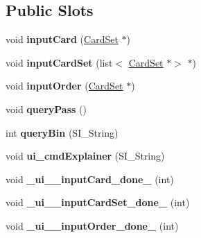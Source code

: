 \subsection*{Public Slots}
\begin{DoxyCompactItemize}
\item 
\mbox{\label{class_user_interaction_a19c4330dde326f5593946abf8f7cd213}} 
void {\bfseries input\+Card} (\hyperlink{class_card_set}{Card\+Set} $\ast$)
\item 
\mbox{\label{class_user_interaction_a65714650c645b9c1865500702b553b7e}} 
void {\bfseries input\+Card\+Set} (list$<$ \hyperlink{class_card_set}{Card\+Set} $\ast$$>$ $\ast$)
\item 
\mbox{\label{class_user_interaction_a3d7c9ea75ca204150e2d2a3aacdda72a}} 
void {\bfseries input\+Order} (\hyperlink{class_card_set}{Card\+Set} $\ast$)
\item 
\mbox{\label{class_user_interaction_ab7bce422790b17da78f8cdb45b928013}} 
void {\bfseries query\+Pass} ()
\item 
\mbox{\label{class_user_interaction_a5c4d87eabeb266804c9241b65c198ccc}} 
int {\bfseries query\+Bin} (S\+I\+\_\+\+String)
\item 
\mbox{\label{class_user_interaction_ac6b37c0ff86d0b43d91549a9b4ac507e}} 
void {\bfseries ui\+\_\+cmd\+Explainer} (S\+I\+\_\+\+String)
\item 
\mbox{\label{class_user_interaction_ae7a4c5b0c42d14d856162b4fd27e7e5e}} 
void {\bfseries \+\_\+ui\+\_\+\+\_\+input\+Card\+\_\+done\+\_\+} (int)
\item 
\mbox{\label{class_user_interaction_a0cd507e630245a236fa513442a0d93fa}} 
void {\bfseries \+\_\+ui\+\_\+\+\_\+input\+Card\+Set\+\_\+done\+\_\+} (int)
\item 
\mbox{\label{class_user_interaction_a4de40f4c6a8e16b06727cca57ed1d320}} 
void {\bfseries \+\_\+ui\+\_\+\+\_\+input\+Order\+\_\+done\+\_\+} (int)
\end{DoxyCompactItemize}
